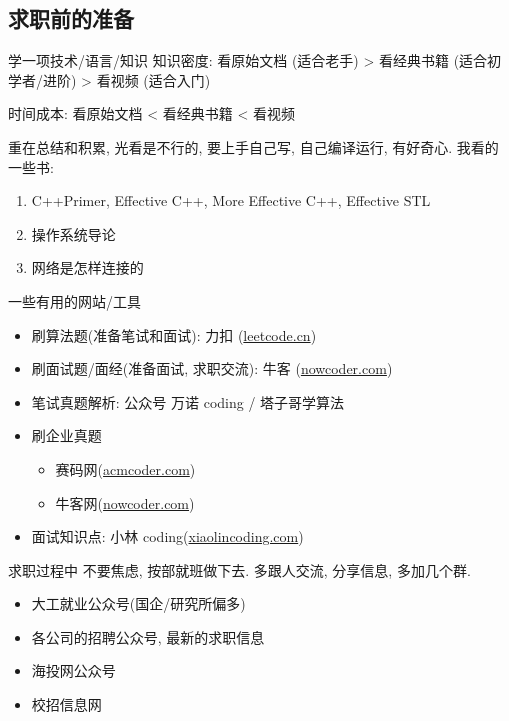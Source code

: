 \documentclass{ctexbeamer}
\begin{document}
\subsection{求职前的准备}
\begin{frame}
	\begin{alertblock}{学一项技术/语言/知识}
		知识密度: 看原始文档 (适合老手) > 看经典书籍 (适合初学者/进阶) > 看视频 (适合入门)

		时间成本: 看原始文档 < 看经典书籍 < 看视频
	\end{alertblock}
	重在总结和积累, 光看是不行的, 要上手自己写, 自己编译运行, 有好奇心. 
	我看的一些书:
	\begin{enumerate}
		\item C++Primer, Effective C++, More Effective C++, Effective STL
		\item 操作系统导论
		\item 网络是怎样连接的
	\end{enumerate}
\end{frame}


\begin{frame}{一些有用的网站/工具}
	\begin{itemize}
		\item 刷算法题(准备笔试和面试): 力扣 (\hyperref[https://leetcode.cn]{leetcode.cn})
		\item 刷面试题/面经(准备面试, 求职交流): 牛客 (\hyperref[https://nowcoder.com]{nowcoder.com})
		\item 笔试真题解析: 公众号 万诺 coding / 塔子哥学算法
		\item 刷企业真题
		      \begin{itemize}
			      \item 赛码网(\hyperref[https://acmcoder.com]{acmcoder.com})
			      \item 牛客网(\hyperref[https://nowcoder.com]{nowcoder.com})
		      \end{itemize}
		\item 面试知识点: 小林 coding(\hyperref[https://xiaolincoding.com]{xiaolincoding.com})
	\end{itemize}
\end{frame}



\begin{frame}{求职过程中}
	不要焦虑, 按部就班做下去. 
	多跟人交流, 分享信息, 多加几个群. 
	\begin{itemize}
		\item 大工就业公众号(国企/研究所偏多)
		\item 各公司的招聘公众号, 最新的求职信息
		\item 海投网公众号
		\item 校招信息网
	\end{itemize}
\end{frame}
\end{document}
